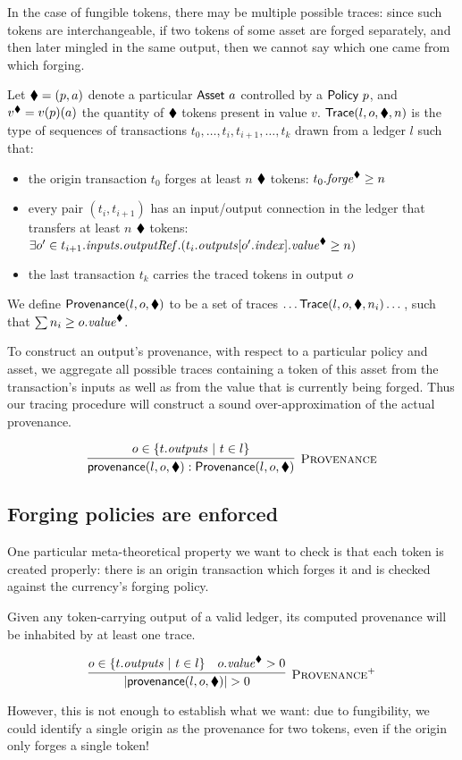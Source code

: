 In the case of fungible tokens, there may be multiple possible traces:
since such tokens are interchangeable, if two tokens of some asset are forged separately, and then
later mingled in the same output, then we cannot say which one came from which forging.

Let $\blacklozenge = (p , a)$ denote a particular $\textsf{Asset}\ a$ controlled by a $\textsf{Policy}\ p$,
and $v^\blacklozenge = v(p)(a)$ the quantity of $\blacklozenge$ tokens present in value $v$.
$\textsf{Trace}(l,o,\blacklozenge,n)$ is the type of sequences of transactions
$t_0,\dots, t_i, t_{i +1},\dots, t_k$ drawn from a ledger $l$ such that:
\begin{itemize}
\item the origin transaction $t_0$ forges at least $n$ $\blacklozenge$
  tokens: $t_0.\mathit{forge}^\blacklozenge \ge n$
\item every pair $(t_i,t_{i + 1})$ has an input/output connection in
  the ledger that transfers at least $n$ $\blacklozenge$ tokens:
  $\exists o' \in t_{i + 1}.\mathit{inputs}.\mathit{outputRef}. (t_i.\mathit{outputs}[o'.\mathit{index}].\mathit{value}^\blacklozenge \ge n)$
\item the last transaction $t_k$ carries the traced tokens in output $o$
\end{itemize}
We define $\textsf{Provenance}(l,o,\blacklozenge)$ to be a
set of traces $\dots \textsf{Trace}(l,o,\blacklozenge,n_i)\dots$, such that $\sum n_i \ge o.\mathit{value}^\blacklozenge$.

To construct an output's provenance, with respect to
a particular policy and asset, we aggregate all possible
traces containing a token of this asset from the transaction's inputs as well
as from the value that is currently being forged.
Thus our tracing procedure will construct a sound over-approximation of the actual provenance.

\begin{displaymath}
\infer[\textsc{Provenance}]
  {\provenance(l,o,\nft) : \Provenance(l,o,\nft)}
  {o \in \{ t.\outputs \ | \ t \in l \}}
\end{displaymath}

\subsection{Forging policies are enforced}

One particular meta-theoretical property we want to check is
that each token is created properly: there is an origin transaction which forges
it and is checked against the currency's forging policy.

\begin{proposition}
Given any token-carrying output of a valid ledger,
its computed provenance will be inhabited by at least one trace.

\begin{displaymath}
\infer[\textsc{Provenance}^+]
  {|\provenance(l, o, \nft)| > 0}
  {%
    o \in \{ t.\outputs \ | \ t \in l \}
  & o.\val^\nft > 0
  }
\end{displaymath}
\end{proposition}
%
However, this is not enough to establish what we want: due to
fungibility, we could identify a single origin as the provenance for
two tokens, even if the origin only forges a single token!

